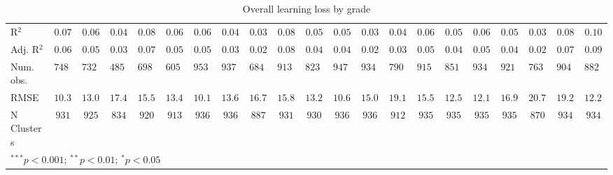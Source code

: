 \begin{table}
\begin{center}
\begin{tabular}{l c c c c c c c c c c c c c c c c c c c c}
\hline
R$^2$                     & $0.07$        & $0.06$        & $0.04$        & $0.08$        & $0.06$       & $0.06$        & $0.04$        & $0.03$        & $0.08$        & $0.05$   & $0.05$        & $0.03$        & $0.04$        & $0.06$        & $0.05$       & $0.06$        & $0.05$        & $0.03$        & $0.08$        & $0.10$        \\
Adj. R$^2$                & $0.06$        & $0.05$        & $0.03$        & $0.07$        & $0.05$       & $0.05$        & $0.03$        & $0.02$        & $0.08$        & $0.04$   & $0.04$        & $0.02$        & $0.03$        & $0.05$        & $0.04$       & $0.05$        & $0.04$        & $0.02$        & $0.07$        & $0.09$        \\
Num. obs.                 & $74829$       & $73263$       & $48537$       & $69841$       & $60521$      & $95364$       & $93769$       & $68412$       & $91315$       & $82377$  & $94747$       & $93417$       & $79016$       & $91567$       & $85189$      & $93439$       & $92180$       & $76397$       & $90403$       & $88251$       \\
RMSE                      & $10.39$       & $13.01$       & $17.43$       & $15.55$       & $13.49$      & $10.18$       & $13.64$       & $16.74$       & $15.80$       & $13.28$  & $10.67$       & $15.02$       & $19.15$       & $15.55$       & $12.57$      & $12.17$       & $16.92$       & $20.72$       & $19.23$       & $12.21$       \\
N Clusters                & $931$         & $925$         & $834$         & $920$         & $913$        & $936$         & $936$         & $887$         & $931$         & $930$    & $936$         & $936$         & $912$         & $935$         & $935$        & $935$         & $935$         & $870$         & $934$         & $934$         \\
\hline
\multicolumn{21}{l}{\scriptsize{$^{***}p<0.001$; $^{**}p<0.01$; $^{*}p<0.05$}}
\end{tabular}
\caption{Overall learning loss by grade}
\label{table:grade}
\end{center}
\end{table}
